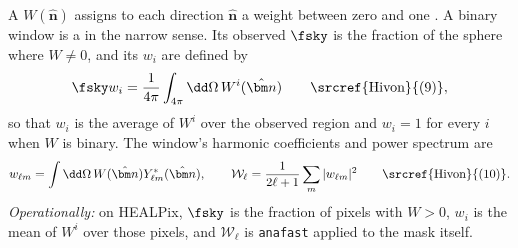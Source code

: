 \begin{workdef}
A  $W(\hat{\bm n})$ assigns to each direction $\hat{\bm n}$ a weight between zero and one
. A binary window is
a  in the narrow sense. Its observed  $\fsky$ is the fraction of
the sphere where $W\neq0$, and its  $w_i$ are defined by
\[
  \fsky w_i=\frac1{4\pi}\int_{4\pi}\dd\Omega\,W^i(\hat{\bm n})
  \qquad\text{\srcref{Hivon}{(9)}},
\]
so that $w_i$ is the average of $W^i$ over the observed region and $w_i=1$ for every $i$ when
$W$ is binary. The window's harmonic coefficients and power spectrum are
\[
  w_{\ell m}=\int\dd\Omega\,W(\hat{\bm n})Y^*_{\ell m}(\hat{\bm n}),\qquad
  \mathcal W_\ell=\frac1{2\ell+1}\sum_m|w_{\ell m}|^2
  \qquad\text{\srcref{Hivon}{(10)}}.
\]
\emph{Operationally:} on HEALPix, $\fsky$ is the fraction of pixels with $W>0$, $w_i$ is the mean
of $W^i$ over those pixels, and $\mathcal W_\ell$ is \texttt{anafast} applied to the mask itself.
\end{workdef}

